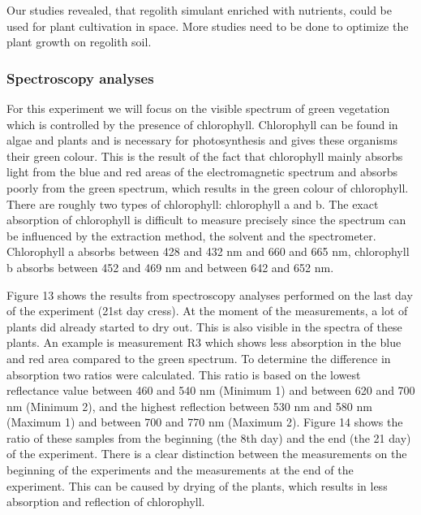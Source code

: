 \documentclass[preprint]{elsarticle}
\begin{document}
Our studies revealed, that regolith simulant enriched with nutrients, could be used for plant cultivation in space. More studies need to be done to optimize the plant growth on regolith soil.

\subsubsection{Spectroscopy analyses}
For this experiment we will focus on the visible spectrum of green vegetation which is controlled by the presence of chlorophyll. Chlorophyll can be found in algae and plants and is necessary for photosynthesis and gives these organisms their green colour. This is the result of the fact that chlorophyll mainly absorbs light from the blue and red areas of the electromagnetic spectrum and absorbs poorly from the green spectrum, which results in the green colour of chlorophyll. There are roughly two types of chlorophyll: chlorophyll a and b. The exact absorption of chlorophyll is difficult to measure precisely since the spectrum can be influenced by the extraction method, the solvent and the spectrometer. Chlorophyll a absorbs between 428 and 432 nm and 660 and 665 nm, chlorophyll b absorbs between 452 and 469 nm and between 642 and 652 nm.

Figure 13 shows the results from spectroscopy analyses performed on the last day of the experiment (21st day cress). At the moment of the measurements, a lot of plants did already started to dry out. This is also visible in the spectra of these plants. An example is measurement R3 which shows less absorption in the blue and red area compared to the green spectrum. To determine the difference in absorption two ratios were calculated. This ratio is based on the lowest reflectance value between 460 and 540 nm (Minimum 1) and between 620 and 700 nm (Minimum 2), and the highest reflection between 530 nm and 580 nm (Maximum 1) and between 700 and 770 nm (Maximum 2). Figure 14 shows the ratio of these samples from the beginning (the 8th day) and the end (the 21 day) of the experiment. There is a clear distinction between the measurements on the beginning of the experiments and the measurements at the end of the experiment. This can be caused by drying of the plants, which results in less absorption and reflection of chlorophyll.
\end{document}
